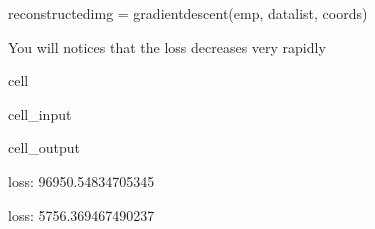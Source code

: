 \documentclass[letterpaper,10pt,english]{jupyterBook}
\begin{document}
\begin{sphinxVerbatim}[commandchars=\\\{\}]
reconstructed\PYGZus{}img = gradient\PYGZus{}descent(emp, data\PYGZus{}list, coords)
\end{sphinxVerbatim}

\sphinxAtStartPar
You will notices that the loss decreases very rapidly

\begin{sphinxuseclass}{cell}\begin{sphinxVerbatimInput}

\begin{sphinxuseclass}{cell_input}
\begin{sphinxVerbatim}[commandchars=\\\{\}]
          
  

\end{sphinxVerbatim}

\end{sphinxuseclass}\end{sphinxVerbatimInput}
\begin{sphinxVerbatimOutput}

\begin{sphinxuseclass}{cell_output}
\begin{sphinxVerbatim}[commandchars=\\\{\}]
loss: 96950.54834705345
\end{sphinxVerbatim}

\begin{sphinxVerbatim}[commandchars=\\\{\}]
loss: 5756.369467490237
\end{sphinxVerbatim}


\end{sphinxuseclass}
\end{sphinxVerbatimOutput}
\end{sphinxuseclass}
\end{document}
